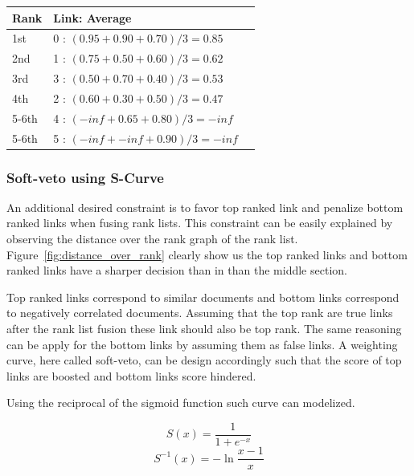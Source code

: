 \begin{table}
  \vspace{0.5cm}

  \begin{tabular}{l l l}
    \toprule
    Rank & Link: Average \\
    \midrule
    1st & 0 : $(0.95 + 0.90 + 0.70)/3 = 0.85$ \\
    2nd & 1 : $(0.75 + 0.50 + 0.60)/3 = 0.62$ \\
    3rd & 3 : $(0.50 + 0.70 + 0.40)/3 = 0.53$ \\
    4th & 2 : $(0.60 + 0.30 + 0.50)/3 = 0.47$ \\
    5-6th & 4 : $(-inf + 0.65 + 0.80)/3 = -inf$ \\
    5-6th & 5 : $(-inf + -inf + 0.90)/3 = -inf$ \\
    \bottomrule
  \end{tabular}
\end{table}

\subsubsection{Soft-veto using S-Curve}

An additional desired constraint is to favor top ranked link and penalize bottom ranked links when fusing rank lists.
This constraint can be easily explained by observing the distance over the rank graph of the rank list.
Figure~\ref{fig:distance_over_rank} clearly show us the top ranked links and bottom ranked links have a sharper decision than in than the middle section.

Top ranked links correspond to similar documents and bottom links correspond to negatively correlated documents.
Assuming that the top rank are true links after the rank list fusion these link should also be top rank.
The same reasoning can be apply for the bottom links by assuming them as false links.
A weighting curve, here called soft-veto, can be design accordingly such that the score of top links are boosted and  bottom links score hindered.

Using the reciprocal of the sigmoid function such curve can modelized.

\begin{equation}
  \label{eq:sigmoid}
  S(x) = \frac{1}{1+e^{-x}}
\end{equation}
\begin{equation}
  \label{eq:sigmoid_r}
  S^{-1}(x) = -\ln{\frac{x-1}{x}}
\end{equation}

